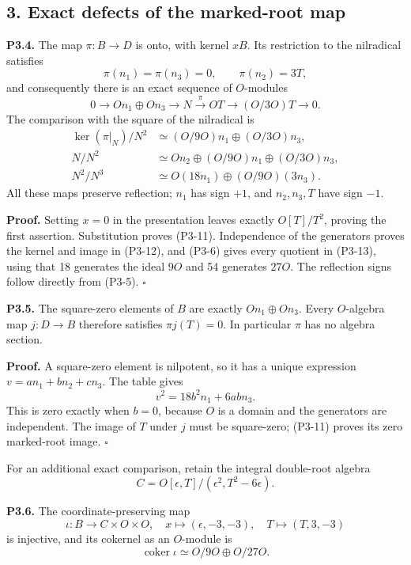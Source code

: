 \documentclass[
]{article}
\begin{document}
\subsection{3. Exact defects of the marked-root
map}\label{exact-defects-of-the-marked-root-map}

\textbf{P3.4.} The map \(\pi:B\to D\) is onto, with kernel \(xB\). Its
restriction to the nilradical satisfies \[
\pi(n_1)=\pi(n_3)=0,\qquad\pi(n_2)=3T,
\tag{P3-11}
\] and consequently there is an exact sequence of \(O\)-modules \[
0\longrightarrow On_1\oplus On_3\longrightarrow N
\xrightarrow{\ \pi\ }OT\longrightarrow (O/3O)T\longrightarrow0.
\tag{P3-12}
\] The comparison with the square of the nilradical is \[
\begin{aligned}
\ker(\pi|_N)/N^2&\simeq (O/9O)n_1\oplus(O/3O)n_3,\\
N/N^2&\simeq On_2\oplus(O/9O)n_1\oplus(O/3O)n_3,\\
N^2/N^3&\simeq O(18n_1)\oplus(O/9O)(3n_3).
\end{aligned}
\tag{P3-13}
\] All these maps preserve reflection; \(n_1\) has sign \(+1\), and
\(n_2,n_3,T\) have sign \(-1\).

\textbf{Proof.} Setting \(x=0\) in the presentation leaves exactly
\(O[T]/T^2\), proving the first assertion. Substitution proves (P3-11).
Independence of the generators proves the kernel and image in (P3-12),
and (P3-6) gives every quotient in (P3-13), using that 18 generates the
ideal \(9O\) and 54 generates \(27O\). The reflection signs follow
directly from (P3-5). \(\square\)

\textbf{P3.5.} The square-zero elements of \(B\) are exactly
\(On_1\oplus On_3\). Every \(O\)-algebra map \(j:D\to B\) therefore
satisfies \(\pi j(T)=0\). In particular \(\pi\) has no algebra section.

\textbf{Proof.} A square-zero element is nilpotent, so it has a unique
expression \(v=an_1+bn_2+cn_3\). The table gives \[
v^2=18b^2n_1+6abn_3.
\tag{P3-14}
\] This is zero exactly when \(b=0\), because \(O\) is a domain and the
generators are independent. The image of \(T\) under \(j\) must be
square-zero; (P3-11) proves its zero marked-root image. \(\square\)

For an additional exact comparison, retain the integral double-root
algebra \[
C=O[\epsilon,T]/(\epsilon^2,T^2-6\epsilon).
\tag{P3-15}
\]

\textbf{P3.6.} The coordinate-preserving map \[
\iota:B\longrightarrow C\times O\times O,
\quad x\longmapsto(\epsilon,-3,-3),\quad
T\longmapsto(T,3,-3)
\tag{P3-16}
\] is injective, and its cokernel as an \(O\)-module is \[
\operatorname{coker}\iota\simeq O/9O\oplus O/27O.
\tag{P3-17}
\]
\end{document}
